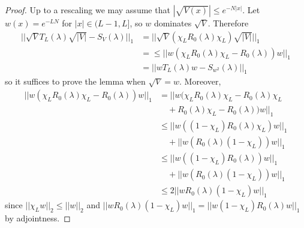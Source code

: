 \documentclass[12pt]{report}
\theoremstyle{definition}
\begin{document}
\begin{proof}
Up to a rescaling we may assume that $|\sqrt{V(x)}| \leq e^{-N|x|}$. Let $w(x) = e^{-LN}$ for $|x| \in (L-1, L]$, so $w$ dominates $\sqrt V$. Therefore
\begin{align*}
||\sqrt V T_L(\lambda) \sqrt{|V|} - S_V(\lambda)||_1 &= ||\sqrt V(\chi_L R_0(\lambda)\chi_L)\sqrt{|V|}||_1\\
  &= \leq ||w(\chi_L R_0(\lambda) \chi_L - R_0(\lambda))w||_1 \\
  &= ||wT_L(\lambda)w - S_{w^2}(\lambda)||_1
\end{align*}
so it suffices to prove the lemma when $\sqrt V = w$. Moreover,
\begin{align*}
||w(\chi_L R_0(\lambda) \chi_L - R_0(\lambda))w||_1 &= ||w(\chi_L R_0(\lambda) \chi_L - R_0(\lambda)\chi_L \\
  &\quad+ R_0(\lambda)\chi_L - R_0(\lambda))w||_1\\
  &\leq ||w((1 - \chi_L)R_0(\lambda)\chi_L)w||_1 \\
  &\quad+ ||w(R_0(\lambda)(1 - \chi_L))w||_1\\
  &\leq ||w((1 - \chi_L)R_0(\lambda))w||_1 \\
  &\quad + ||w(R_0(\lambda)(1 - \chi_L))w||_1\\
  &\leq 2||wR_0(\lambda)(1 - \chi_L)w||_1
\end{align*}
since $||\chi_Lw||_2 \leq ||w||_2$ and $||wR_0(\lambda)(1 - \chi_L)w||_1 = ||w(1 - \chi_L)R_0(\lambda)w||_1$ by adjointness.


\end{proof}
\end{document}
